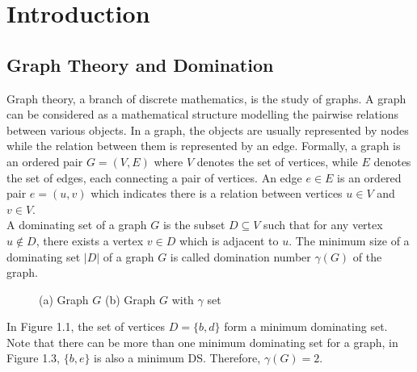 \chapter{Introduction}

\section{Graph Theory and Domination}
Graph theory, a branch of discrete mathematics, is the study of graphs. A graph can be considered as a mathematical structure modelling the pairwise relations between various objects. In a graph, the objects are usually represented by nodes while the relation between them is represented by an edge. 
Formally, a graph is an ordered pair $G = (V,E)$ where $V$ denotes the set of vertices, while $E$ denotes the set of edges, each connecting a pair of vertices. An edge $e \in E$ is an ordered pair $e = (u,v)$ which indicates there is a relation between vertices $u \in V$ and $v \in V$. 
\\
A dominating set of a graph $G$ is the subset $D \subseteq V$ such that for any vertex $u \notin D$, there exists a vertex $v \in D$ which is adjacent to $u$. The minimum size of a dominating set $|D|$ of a graph $G$ is called domination number $\gamma(G)$ of the graph.
\\
\begin{figure}[H]
	\centering
	\caption{(a) Graph $G$ (b) Graph $G$ with $\gamma $ set}
\end{figure}
\noindent
In Figure 1.1, the set of vertices $D= \{ b,d\}$ form a minimum dominating set. Note that there can be more than one minimum dominating set for a graph, in Figure 1.3, $\{ b,e \}$ is also a minimum DS. Therefore, $\gamma(G)=2$. \\
\noindent

